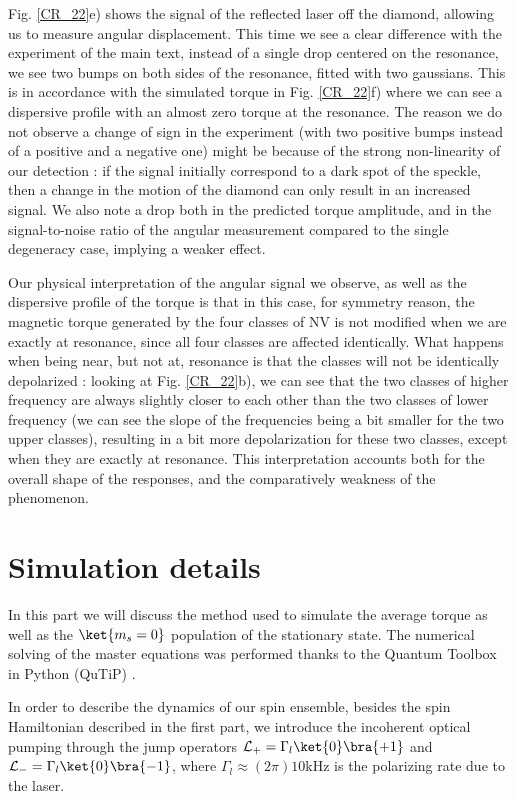 \documentclass[preprintnumbers,amsmath,amssymb,onecolumn,12pt]{revtex4}
\begin{document}
Fig. \ref{CR_22}e) shows the signal of the reflected laser off the diamond, allowing us to measure angular displacement. This time we see a clear difference with the experiment of the main text, instead of a single drop centered on the resonance, we see two bumps on both sides of the resonance, fitted with two gaussians.
This is in accordance with the simulated torque in Fig. \ref{CR_22}f) where we can see a dispersive profile with an almost zero torque at the resonance. The reason we do not observe a change of sign in the experiment (with two positive bumps instead of a positive and a negative one) might be because of the strong non-linearity of our detection : if the signal initially correspond to a dark spot of the speckle, then a change in the motion of the diamond can only result in an increased signal. We also note a drop both in the predicted torque amplitude, and in the signal-to-noise ratio  of the angular measurement compared to the single degeneracy case, implying a weaker effect.

Our physical interpretation of the angular signal we observe, as well as the dispersive profile of the torque is that in this case, for symmetry reason, the magnetic torque generated by the four classes of NV is not modified when we are exactly at resonance, since all four classes are affected identically. What happens when being near, but not at, resonance is that the classes will not be identically depolarized : looking at Fig. \ref{CR_22}b), we can see that the two classes of higher frequency are always slightly closer to each other than the two classes of lower frequency (we can see the slope of the frequencies being a bit smaller for the two upper classes), resulting in a bit more depolarization for these two classes, except when they are exactly at resonance. This interpretation accounts both for the overall shape of the responses, and the comparatively weakness of the phenomenon.


\section{Simulation details}
\label{Simu}
In this part we will discuss the method used to simulate the average torque as well as the $\ket{m_s=0}$ population of the stationary state. The numerical solving of the master equations was performed thanks to the Quantum Toolbox in Python (QuTiP) \citep{qutip1} \citep{qutip2}.

In order to describe the dynamics of our spin ensemble, besides the spin Hamiltonian described in the first part, we introduce the incoherent optical pumping through the jump operators $\mathcal{L}_+ = \Gamma_l \ket{0}\bra{+1} $ and $\mathcal{L}_- = \Gamma_l \ket{0}\bra{-1} $, where $\Gamma_l \approx (2\pi) 10$kHz is the polarizing rate due to the laser.
\end{document}
